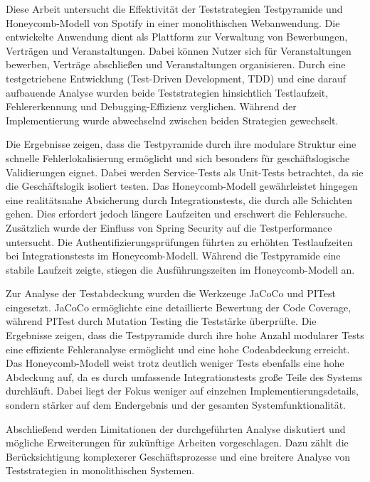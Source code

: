 Diese Arbeit untersucht die Effektivität der Teststrategien Testpyramide und Honeycomb-Modell von Spotify in einer monolithischen Webanwendung. Die entwickelte Anwendung dient als Plattform zur Verwaltung von Bewerbungen, Verträgen und Veranstaltungen. Dabei können Nutzer sich für Veranstaltungen bewerben, Verträge abschließen und Veranstaltungen organisieren.  Durch eine testgetriebene Entwicklung (Test-Driven Development, TDD) und eine darauf aufbauende Analyse wurden beide Teststrategien hinsichtlich Testlaufzeit, Fehlererkennung und Debugging-Effizienz verglichen. Während der Implementierung wurde abwechselnd zwischen beiden Strategien gewechselt.

Die Ergebnisse zeigen, dass die Testpyramide durch ihre modulare Struktur eine schnelle Fehlerlokalisierung ermöglicht und sich besonders für geschäftslogische Validierungen eignet. Dabei werden Service-Tests als Unit-Tests betrachtet, da sie die Geschäftslogik isoliert testen. Das Honeycomb-Modell gewährleistet hingegen eine realitätsnahe Absicherung durch Integrationstests, die durch alle Schichten gehen. Dies erfordert jedoch längere Laufzeiten und erschwert die Fehlersuche. Zusätzlich wurde der Einfluss von Spring Security auf die Testperformance untersucht. Die Authentifizierungsprüfungen führten zu erhöhten Testlaufzeiten bei Integrationstests im Honeycomb-Modell. Während die Testpyramide eine stabile Laufzeit zeigte, stiegen die Ausführungszeiten im Honeycomb-Modell an.

Zur Analyse der Testabdeckung wurden die Werkzeuge JaCoCo und PITest eingesetzt. JaCoCo ermöglichte eine detaillierte Bewertung der Code Coverage, während PITest durch Mutation Testing die Teststärke überprüfte. Die Ergebnisse zeigen, dass die Testpyramide durch ihre hohe Anzahl modularer Tests eine effiziente Fehleranalyse ermöglicht und eine hohe Codeabdeckung erreicht. Das Honeycomb-Modell weist trotz deutlich weniger Tests ebenfalls eine hohe Abdeckung auf, da es durch umfassende Integrationstests große Teile des Systems durchläuft. Dabei liegt der Fokus weniger auf einzelnen Implementierungsdetails, sondern stärker auf dem Endergebnis und der gesamten Systemfunktionalität.

Abschließend werden Limitationen der durchgeführten Analyse diskutiert und mögliche Erweiterungen für zukünftige Arbeiten vorgeschlagen. Dazu zählt die Berücksichtigung komplexerer Geschäftsprozesse und eine breitere Analyse von Teststrategien in monolithischen Systemen.